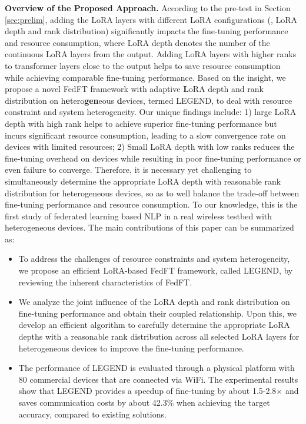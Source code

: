 \textbf{Overview of the Proposed Approach.} 
According to the pre-test in Section \ref{sec:prelim}, adding the LoRA layers with different LoRA configurations (\eg, LoRA depth and rank distribution) significantly impacts the fine-tuning performance and resource consumption, where LoRA depth denotes the number of the continuous LoRA layers from the output. 
Adding LoRA layers with higher ranks to transformer layers close to the output helps to save resource consumption while achieving comparable fine-tuning performance.
Based on the insight, we propose a novel FedFT framework with adaptive \textbf{L}oRA depth and rank distribution on h\textbf{e}tero\textbf{gen}eous \textbf{d}evices, termed LEGEND, to deal with resource constraint and system heterogeneity.
Our unique findings include: 1) 
large LoRA depth with high rank helps to achieve superior fine-tuning performance but incurs significant resource consumption, leading to a slow convergence rate on devices with limited resources; 2) Small LoRA depth with low ranks reduces the fine-tuning overhead on devices while resulting in poor fine-tuning performance or even failure to converge.
Therefore, it is necessary yet challenging to simultaneously determine the appropriate LoRA depth with reasonable rank distribution for heterogeneous devices, so as to well balance the trade-off between fine-tuning performance and resource consumption.
To our knowledge, this is the first study of federated learning based NLP in a real wireless testbed with heterogeneous devices.
The main contributions of this paper can be summarized as:
\vspace{-0.1cm}
\begin{itemize}
    \vspace{-0.2cm}
    \item To address the challenges of resource constraints and system heterogeneity, we propose an efficient LoRA-based FedFT framework, called LEGEND, by reviewing the inherent characteristics of FedFT.
    \vspace{-0.3cm}
    \item We analyze the joint influence of the LoRA depth and rank distribution on fine-tuning performance and obtain their coupled relationship. 
    Upon this, we develop an efficient algorithm to carefully determine the appropriate LoRA depths with a reasonable rank distribution across all selected LoRA layers for heterogeneous devices to improve the fine-tuning performance.
    \vspace{-0.3cm}
    \item The performance of LEGEND is evaluated through a physical platform with 80 commercial devices that are connected via WiFi.
    The experimental results show that LEGEND provides a speedup of fine-tuning by about 1.5-2.8$\times$ and saves communication costs by about 42.3\% when achieving the target accuracy, compared to existing solutions.
\end{itemize}
\vspace{-0.5cm}


